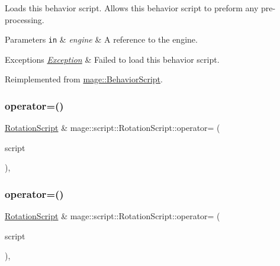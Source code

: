 Loads this behavior script. Allows this behavior script to preform any pre-\/processing.


\begin{DoxyParams}[1]{Parameters}
\mbox{\tt in}  & {\em engine} & A reference to the engine. \\
\hline
\end{DoxyParams}

\begin{DoxyExceptions}{Exceptions}
{\em \hyperlink{classmage_1_1_exception}{Exception}} & Failed to load this behavior script. \\
\hline
\end{DoxyExceptions}


Reimplemented from \hyperlink{classmage_1_1_behavior_script_ae7864876b2ffb1d1d8d8a56e3099f1f2}{mage\+::\+Behavior\+Script}.

\hypertarget{classmage_1_1script_1_1_rotation_script_a9302878671d095bab0c31a379ad7d964}{}\label{classmage_1_1script_1_1_rotation_script_a9302878671d095bab0c31a379ad7d964} 
\subsubsection{\texorpdfstring{operator=()}{operator=()}\hspace{0.1cm}{\footnotesize\ttfamily [1/2]}}
{\footnotesize\ttfamily \hyperlink{classmage_1_1script_1_1_rotation_script}{Rotation\+Script} \& mage\+::script\+::\+Rotation\+Script\+::operator= (\begin{DoxyParamCaption}\item[{const \hyperlink{classmage_1_1script_1_1_rotation_script}{Rotation\+Script} \&}]{script }\end{DoxyParamCaption})\hspace{0.3cm}{\ttfamily [default]}, {\ttfamily [noexcept]}}

\hypertarget{classmage_1_1script_1_1_rotation_script_af75323393f7570b9fcee0cd62c4f76bd}{}\label{classmage_1_1script_1_1_rotation_script_af75323393f7570b9fcee0cd62c4f76bd} 
\subsubsection{\texorpdfstring{operator=()}{operator=()}\hspace{0.1cm}{\footnotesize\ttfamily [2/2]}}
{\footnotesize\ttfamily \hyperlink{classmage_1_1script_1_1_rotation_script}{Rotation\+Script} \& mage\+::script\+::\+Rotation\+Script\+::operator= (\begin{DoxyParamCaption}\item[{\hyperlink{classmage_1_1script_1_1_rotation_script}{Rotation\+Script} \&\&}]{script }\end{DoxyParamCaption})\hspace{0.3cm}{\ttfamily [default]}, {\ttfamily [noexcept]}}

